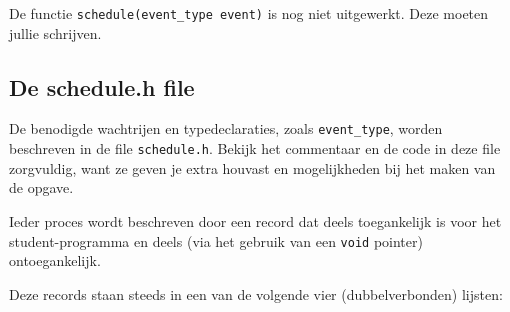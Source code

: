 \documentclass[11pt,a4paper,twoside]{article}
\begin{document}
De functie \texttt{schedule(event\_type event)} is nog niet
uitgewerkt. Deze moeten jullie schrijven. 

\subsection*{De schedule.h file}

De benodigde wachtrijen en typedeclaraties, zoals \texttt{event\_type},
worden beschreven in de file \texttt{schedule.h}.
Bekijk het commentaar en de code in deze file
zorgvuldig, want ze geven je extra houvast en mogelijkheden bij het
maken van de opgave.

Ieder proces wordt beschreven door een record dat deels toegankelijk
is voor het student-programma en deels (via het gebruik van een \texttt{void}
pointer) ontoegankelijk. 

Deze records staan steeds in een van de volgende vier (dubbelverbonden) lijsten: 
\end{document}
